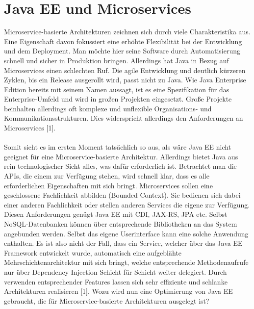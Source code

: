 \section{Java EE und Microservices}
Microservice-basierte Architekturen zeichnen sich durch viele Charakteristika aus. Eine Eigenschaft davon fokussiert eine erhöhte Flexibilität bei der Entwicklung und dem Deployment. Man möchte hier seine Software durch Automatisierung schnell und sicher in Produktion bringen. Allerdings hat Java in Bezug auf Microservices einen schlechten Ruf. Die agile Entwicklung und deutlich kürzeren Zyklen, bis ein Release ausgerollt wird, passt nicht zu Java. Wie Java Enterprise Edition bereits mit seinem Namen aussagt, ist es eine Spezifikation für das Enterprise-Umfeld und wird in großen Projekten eingesetzt. Große Projekte beinhalten allerdings oft komplexe und unflexible Organisations- und Kommunikationsstrukturen. Dies widerspricht allerdings den Anforderungen an Microservices [1]. \\ \\
Somit sieht es im ersten Moment tatsächlich so aus, als wäre Java EE nicht geeignet für eine Microservice-basierte Architektur. Allerdings bietet Java aus rein technologischer Sicht alles, was dafür erforderlich ist. Betrachtet man die APIs, die einem zur Verfügung stehen, wird schnell klar, dass es alle erforderlichen Eigenschaften mit sich bringt. Microservices sollen eine geschlossene Fachlichkeit abbilden (Bounded Context). Sie bedienen sich dabei einer anderen Fachlichkeit oder stellen anderen Services die eigene zur Verfügung. Diesen Anforderungen genügt Java EE mit CDI, JAX-RS, JPA etc. Selbst NoSQL-Datenbanken können über entsprechende Bibliotheken an das System angebunden werden. Selbst das eigene Userinterface kann eine solche Anwendung enthalten. Es ist also nicht der Fall, dass ein Service, welcher über das Java EE Framework entwickelt wurde, automatisch eine aufgeblähte Mehrschichtenarchitektur mit sich bringt, welche entsprechende Methodenaufrufe nur über Dependency Injection Schicht für Schicht weiter delegiert. Durch verwenden entsprechender Features lassen sich sehr effiziente und schlanke Architekturen realisieren [1]. Wozu wird nun eine Optimierung von Java EE gebraucht, die für Microservice-basierte Architekturen ausgelegt ist?

